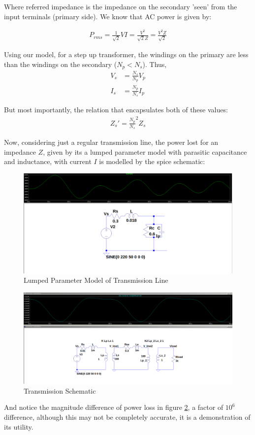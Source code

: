\documentclass{book}
\begin{document}
Where referred impedance is the impedance on the secondary 'seen' from the input terminals (primary side). We know that AC power is given by:

\begin{align*}
	P_{rms} = \frac{1}{\sqrt{2}} V I  = \frac{V^2}{\sqrt{2} Z } =\frac{V^2 Z}{\sqrt{2}}  
\end{align*}

Using our model, for a step up transformer, the windings on the primary are less than the windings on the secondary ($N_p < N_s$). Thus, 
\begin{align*}
	V_s &= \frac{N_s}{N_p} V_p \\
	I_s &= \frac{N_p}{N_s} I_p
\end{align*}

But most importantly, the relation that encapsulates both of these values:
\begin{align*}
	Z_s' = \frac{N_p}{N_s}^2 Z_s
\end{align*}

Now, considering just a regular transmission line, the power lost for an impedance $Z$, given by its a lumped parameter model with parasitic capacitance and inductance, with current $I$ is modelled by the spice schematic:

\begin{figure}[h]
	\centering
	\includegraphics[width=0.5\linewidth]{Screenshots/transmission_line_power}
	\caption{Lumped Parameter Model of Transmission Line}
	\label{fig:transmissionlinepower}
\end{figure}


\begin{figure}[h]
	\centering
	\includegraphics[width=0.4\linewidth]{Screenshots/transmission_line_power1}
	\caption{Transmission Schematic}
	\label{fig:transmissionlinepower1}
\end{figure}

And notice the magnitude difference of power loss in figure \ref{fig:transmissionlinepower1}, a factor of $10^6$ difference, although this may not be completely accurate, it is a demonstration of its utility.
\end{document}
